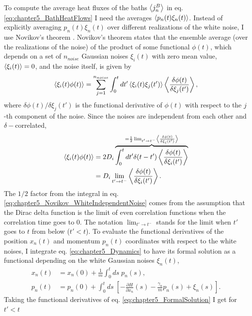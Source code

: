 To compute the average heat fluxes of the baths $\expval{j^B_n}$ in eq. \eqref{eq:chapter5_BathHeatFlows} I need
the averages $\expval{p_n(t)\xi_n(t)}$. Instead of explicitly averaging $p_n(t)\xi_n(t)$ over different realizations of the white noise, I use Novikov's theorem \cite{Novikov1965,Ma2011,Toral2014}. Novikov's theorem states that the ensemble average (over  the realizations of the noise) of the product of some functional $\phi(t)$, which depends on a set of
$n_{noise}$ Gaussian noises $\xi_i(t)$ with zero mean value, $\expval{\xi_i(t)} = 0$, and the noise itself, is given by
%
\begin{equation}
    \expval{\xi_i(t)\phi(t)} = \sum_{j=1}^{n_{noise}}\int_0^t dt' \expval{\xi_i(t)\xi_j(t')} \expval{\frac{\delta \phi(t)}{\delta\xi_j(t')}},
    \label{eq:chapter5_Novikov_GeneralExpression}
\end{equation}
%
where ${\delta \phi(t)}/{\delta\xi_j(t')}$ is the functional derivative of $\phi(t)$ with respect to the $j$-th component of the noise. Since the noises are independent from each other and $\delta-$correlated,
%
\begin{align}
  \expval{\xi_i(t)\phi(t)} &= 2D_i \overbrace{\int_0^t dt' \delta(t-t') \expval{\frac{\delta \phi(t)}{\delta\xi_i(t')}}}^{= \frac{1}{2} \lim_{t'\to t^-} \expval{\frac{\delta \phi(t)}{\delta\xi_i(t')}} }\nonumber\\
  &=D_i \lim_{t'\to t^-} \expval{ \frac{\delta \phi(t)}{\delta\xi_i(t')} }.
  \label{eq:chapter5_Novikov_WhiteIndependentNoise}
\end{align}
%
The $1/2$ factor from the integral in eq. \eqref{eq:chapter5_Novikov_WhiteIndependentNoise} comes from the assumption that the Dirac delta function is the limit of even correlation functions when the correlation time goes to 0. The notation $\lim_{t'\to t^-}$ stands for the limit when $t'$ goes to $t$ from below ($t'<t$). To evaluate the functional derivatives of the position $x_n(t)$ and momentum $p_n(t)$ coordinates with respect to the white noises, I integrate eq. \eqref{eq:chapter5_Dynamics} to have its formal solution as a functional depending on the white Gaussian noises $\xi_n(t)$,
%
\begin{align}
  x_n(t) &= x_n(0) +  \frac{1}{m}\int_0^t ds\; p_n(s) ,\nonumber\\
  p_n(t) &= p_n(0) + \int_0^t ds\; \left[ -\frac{\partial H}{\partial x_n}(s) - \frac{\gamma_n}{m}p_n(s) + \xi_n(s)\right].
  \label{eq:chapter5_FormalSolution}
\end{align}
%
Taking the functional derivatives of eq. \eqref{eq:chapter5_FormalSolution} I get for $t'<t$
